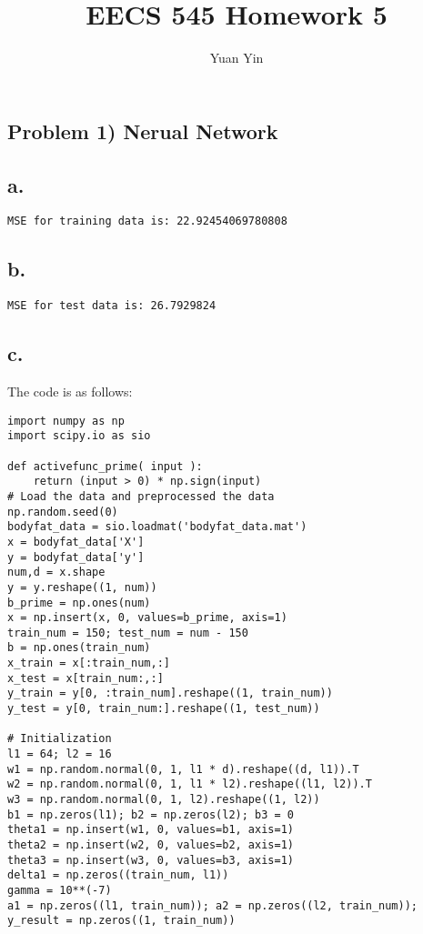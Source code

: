 \documentclass[letterpaper,11pt]{article}
\author{Yuan Yin}
\title{EECS 545 Homework 5}
\begin{document}
\large
\maketitle
\begin{spacing}{1.2}  %
\section*{Problem 1) Nerual Network}
\subsection*{a.}
\begin{lstlisting}
MSE for training data is: 22.92454069780808
\end{lstlisting}

\subsection*{b.}
\begin{lstlisting}
MSE for test data is: 26.7929824
\end{lstlisting}

\subsection*{c.}
The code is as follows:

\begin{lstlisting}
import numpy as np
import scipy.io as sio

def activefunc_prime( input ):
    return (input > 0) * np.sign(input)
# Load the data and preprocessed the data
np.random.seed(0)
bodyfat_data = sio.loadmat('bodyfat_data.mat')
x = bodyfat_data['X']
y = bodyfat_data['y']
num,d = x.shape
y = y.reshape((1, num))
b_prime = np.ones(num)
x = np.insert(x, 0, values=b_prime, axis=1)
train_num = 150; test_num = num - 150
b = np.ones(train_num)
x_train = x[:train_num,:]
x_test = x[train_num:,:]
y_train = y[0, :train_num].reshape((1, train_num))
y_test = y[0, train_num:].reshape((1, test_num))

# Initialization
l1 = 64; l2 = 16
w1 = np.random.normal(0, 1, l1 * d).reshape((d, l1)).T
w2 = np.random.normal(0, 1, l1 * l2).reshape((l1, l2)).T
w3 = np.random.normal(0, 1, l2).reshape((1, l2))
b1 = np.zeros(l1); b2 = np.zeros(l2); b3 = 0
theta1 = np.insert(w1, 0, values=b1, axis=1)
theta2 = np.insert(w2, 0, values=b2, axis=1)
theta3 = np.insert(w3, 0, values=b3, axis=1)
delta1 = np.zeros((train_num, l1))
gamma = 10**(-7)
a1 = np.zeros((l1, train_num)); a2 = np.zeros((l2, train_num)); y_result = np.zeros((1, train_num))


\end{lstlisting}
\end{spacing}
\end{document}

